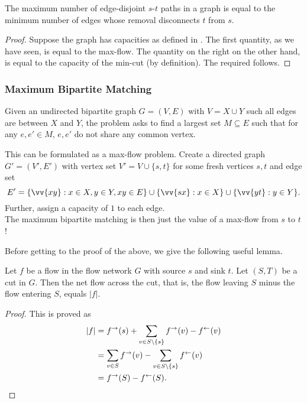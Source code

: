 \begin{theorem}
	The maximum number of edge-disjoint $s$-$t$ paths in a graph is equal to the minimum number of edges whose removal disconnects $t$ from $s$.
\end{theorem}
\begin{proof}
	Suppose the graph has capacities as defined in . The first quantity, as we have seen, is equal to the max-flow. The quantity on the right on the other hand, is equal to the capacity of the min-cut (by definition). The required follows.
\end{proof}

\subsubsection{Maximum Bipartite Matching}

Given an undirected bipartite graph $G=(V,E)$ with $V=X\cup Y$ such all edges are between $X$ and $Y$, the problem asks to find a largest set $M\subseteq E$ such that for any $e,e'\in M$, $e,e'$ do not share any common vertex.

This can be formulated as a max-flow problem. Create a directed graph $G' = (V',E')$ with vertex set $V' = V\cup\{s,t\}$ for some fresh vertices $s,t$ and edge set
\[ E' = \{\vv{xy}: x\in X, y\in Y, xy\in E\} \cup \{\vv{sx} : x\in X\} \cup \{\vv{yt} : y\in Y\}. \]
Further, assign a capacity of $1$ to each edge.\\
The maximum bipartite matching is then just the value of a max-flow from $s$ to $t$!

Before getting to the proof of the above, we give the following useful lemma.

\begin{lemma}
	\label{lem: max bi match}
	Let $f$ be a flow in the flow network $G$ with source $s$ and sink $t$. Let $(S,T)$ be a cut in $G$. Then the net flow across the cut, that is, the flow leaving $S$ minus the flow entering $S$, equals $|f|$.
\end{lemma}
\begin{proof}
	This is proved as
	\begin{align*}
		|f| &= f^\to(s) + \sum_{v\in S\setminus\{s\}} f^\to(v) - f^\leftarrow(v) \\
			&= \sum_{v\in S} f^\to(v) - \sum_{v\in S\setminus\{s\}} f^\leftarrow(v) \\
			&= f^\to(S) - f^\leftarrow(S).\qedhere
	\end{align*}
\end{proof}

